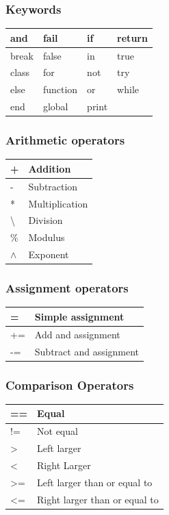 \documentclass[a4paper,12pt]{article}
\begin{document}
\begin{multicols}{2}

  \subsubsection*{Keywords}
  \begin{tabular}{| l | l | l | l | } \hline
    and & fail & if & return \\ \hline
    break & false & in & true \\ \hline
    class & for & not & try \\ \hline
    else & function & or & while \\ \hline
    end & global &  print &  \\ \hline
  \end{tabular}

  \subsubsection*{Arithmetic operators}
  \begin{tabular}{| l | l | } \hline
    + & Addition \\ \hline
    - & Subtraction \\ \hline
    * & Multiplication \\ \hline
    \textbackslash & Division \\ \hline
    \% & Modulus \\ \hline
    \(\wedge\)  & Exponent \\ \hline
  \end{tabular}

  \subsubsection*{Assignment operators}
  \begin{tabular}{| l | l | } \hline
    = & Simple assignment  \\ \hline
    += & Add and assignment  \\ \hline
    -= & Subtract and assignment  \\ \hline
  \end{tabular}

  \subsubsection*{Comparison Operators}
  \begin{tabular}{| l | l | } \hline
    == & Equal \\ \hline
    != & Not equal \\ \hline
    \textgreater & Left larger \\ \hline
    \textless & Right Larger \\ \hline
    \textgreater= & Left larger than or equal to \\ \hline
    \textless= & Right larger than or equal to \\ \hline
  \end{tabular}

\end{multicols}
\end{document}
